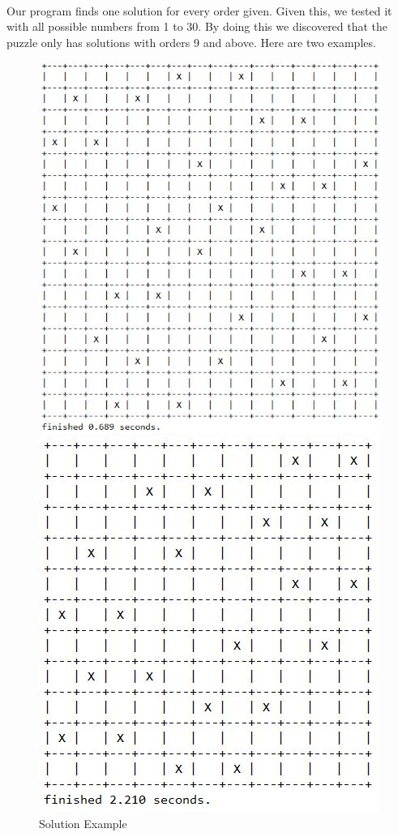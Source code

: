 \documentclass[runningheads]{llncs}
\begin{document}
\paragraph{}
Our program finds one solution for every order given. Given this, we tested it with all possible numbers from 1 to 30.
By doing this we discovered that the puzzle only has solutions with orders 9 and above. Here are two examples.

\begin{figure}
    \begin{center}
        \includegraphics[scale=0.35]{images/gap9.jpg}
        \caption{Solution Example} \label{fig3}
    \end{center}
    \begin{center}
        \includegraphics[scale=0.5]{images/gap11.jpg}

\end{center}
\end{figure}
\end{document}
